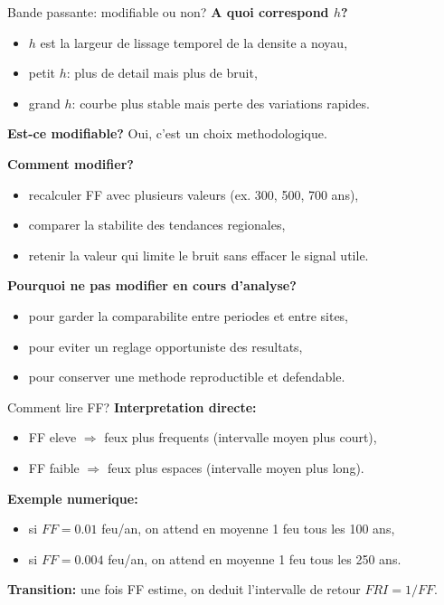 \documentclass[aspectratio=169,11pt]{beamer}
\begin{document}
\begin{frame}{Bande passante: modifiable ou non?}
\textbf{A quoi correspond \(h\)?}
\begin{itemize}
  \item \(h\) est la largeur de lissage temporel de la densite a noyau,
  \item petit \(h\): plus de detail mais plus de bruit,
  \item grand \(h\): courbe plus stable mais perte des variations rapides.
\end{itemize}

\textbf{Est-ce modifiable?} Oui, c'est un choix methodologique.

\textbf{Comment modifier?}
\begin{itemize}
  \item recalculer FF avec plusieurs valeurs (ex. 300, 500, 700 ans),
  \item comparer la stabilite des tendances regionales,
  \item retenir la valeur qui limite le bruit sans effacer le signal utile.
\end{itemize}

\textbf{Pourquoi ne pas modifier en cours d'analyse?}
\begin{itemize}
  \item pour garder la comparabilite entre periodes et entre sites,
  \item pour eviter un reglage opportuniste des resultats,
  \item pour conserver une methode reproductible et defendable.
\end{itemize}
\end{frame}

\begin{frame}{Comment lire FF?}
\textbf{Interpretation directe:}
\begin{itemize}
  \item FF eleve \(\Rightarrow\) feux plus frequents (intervalle moyen plus court),
  \item FF faible \(\Rightarrow\) feux plus espaces (intervalle moyen plus long).
\end{itemize}

\textbf{Exemple numerique:}
\begin{itemize}
  \item si \(FF=0.01\) feu/an, on attend en moyenne 1 feu tous les 100 ans,
  \item si \(FF=0.004\) feu/an, on attend en moyenne 1 feu tous les 250 ans.
\end{itemize}

\textbf{Transition:} une fois FF estime, on deduit l'intervalle de retour \(FRI=1/FF\).
\end{frame}
\end{document}

